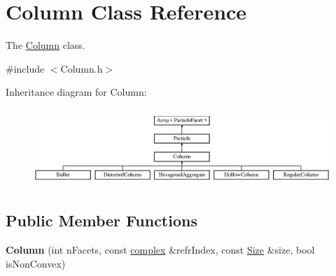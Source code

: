 \hypertarget{class_column}{}\section{Column Class Reference}
\label{class_column}


The \mbox{\hyperlink{class_column}{Column}} class.  




{\ttfamily \#include $<$Column.\+h$>$}

Inheritance diagram for Column\+:\begin{figure}[H]
\begin{center}
\leavevmode
\includegraphics[height=2.947368cm]{class_column}
\end{center}
\end{figure}
\subsection*{Public Member Functions}
\begin{DoxyCompactItemize}
\item 
\mbox{\label{class_column_a7eaee92cd3aed5562652242037e8a58c}} 
{\bfseries Column} (int n\+Facets, const \mbox{\hyperlink{classcomplex}{complex}} \&refr\+Index, const \mbox{\hyperlink{struct_size}{Size}} \&size, bool is\+Non\+Convex)
\end{DoxyCompactItemize}
